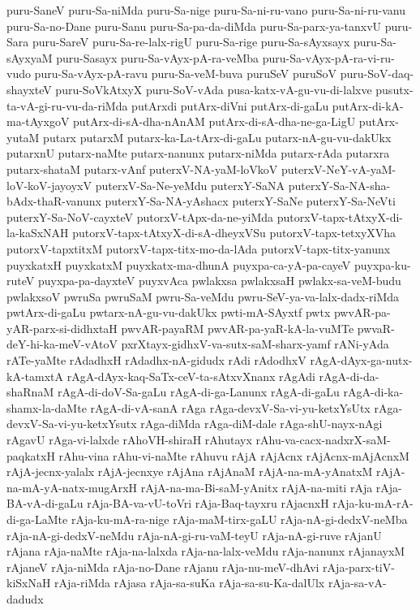 {puru-SaneV
puru-Sa-niMda
puru-Sa-nige
puru-Sa-ni-ru-vano
puru-Sa-ni-ru-vanu
puru-Sa-no-Dane
puru-Sanu
puru-Sa-pa-da-diMda
puru-Sa-parx-ya-tanxvU
puru-Sara
puru-SareV
puru-Sa-re-lalx-rigU
puru-Sa-rige
puru-Sa-sAyxsayx
puru-Sa-sAyxyaM
puru-Sasayx
puru-Sa-vAyx-pA-ra-veMba
puru-Sa-vAyx-pA-ra-vi-ru-vudo
puru-Sa-vAyx-pA-ravu
puru-Sa-veM-buva
puruSeV
puruSoV
puru-SoV-daq-shayxteV
puru-SoVkAtxyX
puru-SoV-vAda
pusa-katx-vA-gu-vu-di-lalxve
pusutx-ta-vA-gi-ru-vu-da-riMda
putArxdi
putArx-diVni
putArx-di-gaLu
putArx-di-kA-ma-tAyxgoV
putArx-di-sA-dha-nAnAM
putArx-di-sA-dha-ne-ga-LigU
putArx-yutaM
putarx
putarxM
putarx-ka-La-tArx-di-gaLu
putarx-nA-gu-vu-dakUkx
putarxnU
putarx-naMte
putarx-nanunx
putarx-niMda
putarx-rAda
putarxra
putarx-shataM
putarx-vAnf
puterxV-NA-yaM-loVkoV
puterxV-NeY-vA-yaM-loV-koV-jayoyxV
puterxV-Sa-Ne-yeMdu
puterxY-SaNA
puterxY-Sa-NA-sha-bAdx-thaR-vanunx
puterxY-Sa-NA-yAshacx
puterxY-SaNe
puterxY-Sa-NeVti
puterxY-Sa-NoV-cayxteV
putorxV-tApx-da-ne-yiMda
putorxV-tapx-tAtxyX-di-la-kaSxNAH
putorxV-tapx-tAtxyX-di-sA-dheyxVSu
putorxV-tapx-tetxyXVha
putorxV-tapxtitxM
putorxV-tapx-titx-mo-da-lAda
putorxV-tapx-titx-yanunx
puyxkatxH
puyxkatxM
puyxkatx-ma-dhunA
puyxpa-ca-yA-pa-cayeV
puyxpa-ku-ruteV
puyxpa-pa-dayxteV
puyxvAca
pwlakxsa
pwlakxsaH
pwlakx-sa-veM-budu
pwlakxsoV
pwruSa
pwruSaM
pwru-Sa-veMdu
pwru-SeV-ya-va-lalx-dadx-riMda
pwtArx-di-gaLu
pwtarx-nA-gu-vu-dakUkx
pwti-mA-SAyxtf
pwtx
pwvAR-pa-yAR-parx-si-didhxtaH
pwvAR-payaRM
pwvAR-pa-yaR-kA-la-vuMTe
pwvaR-deY-hi-ka-meV-vAtoV
pxrXtayx-gidhxV-va-sutx-saM-sharx-yamf
rANi-yAda
rATe-yaMte
rAdadhxH
rAdadhx-nA-gidudx
rAdi
rAdodhxV
rAgA-dAyx-ga-nutx-kA-tamxtA
rAgA-dAyx-kaq-SaTx-ceV-ta-sAtxvXnanx
rAgAdi
rAgA-di-da-shaRnaM
rAgA-di-doV-Sa-gaLu
rAgA-di-ga-Lanunx
rAgA-di-gaLu
rAgA-di-ka-shamx-la-daMte
rAgA-di-vA-sanA
rAga
rAga-devxV-Sa-vi-yu-ketxYsUtx
rAga-devxV-Sa-vi-yu-ketxYsutx
rAga-diMda
rAga-diM-dale
rAga-shU-nayx-nAgi
rAgavU
rAga-vi-lalxde
rAhoVH-shiraH
rAhutayx
rAhu-va-cacx-nadxrX-saM-paqkatxH
rAhu-vina
rAhu-vi-naMte
rAhuvu
rAjA
rAjAcnx
rAjAcnx-mAjAcnxM
rAjA-jecnx-yalalx
rAjA-jecnxye
rAjAna
rAjAnaM
rAjA-na-mA-yAnatxM
rAjA-na-mA-yA-natx-mugArxH
rAjA-na-ma-Bi-saM-yAnitx
rAjA-na-miti
rAja
rAja-BA-vA-di-gaLu
rAja-BA-va-vU-toVri
rAja-Baq-tayxru
rAjacnxH
rAja-ku-mA-rA-di-ga-LaMte
rAja-ku-mA-ra-nige
rAja-maM-tirx-gaLU
rAja-nA-gi-dedxV-neMba
rAja-nA-gi-dedxV-neMdu
rAja-nA-gi-ru-vaM-teyU
rAja-nA-gi-ruve
rAjanU
rAjana
rAja-naMte
rAja-na-lalxda
rAja-na-lalx-veMdu
rAja-nanunx
rAjanayxM
rAjaneV
rAja-niMda
rAja-no-Dane
rAjanu
rAja-nu-meV-dhAvi
rAja-parx-tiV-kiSxNaH
rAja-riMda
rAjasa
rAja-sa-suKa
rAja-sa-su-Ka-dalUlx
rAja-sa-vA-dadudx
}
